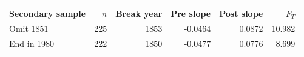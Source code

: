 \begin{tabular}{lrrrrr}
\toprule
Secondary sample & $n$ & Break year & Pre slope & Post slope & $F_T$ \\
\midrule
Omit 1851 & 225 & 1853 & -0.0464 & 0.0872 & 10.982 \\
End in 1980 & 222 & 1850 & -0.0477 & 0.0776 & 8.699 \\
\bottomrule
\end{tabular}

